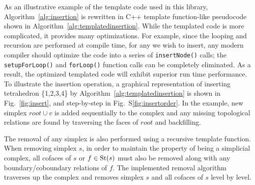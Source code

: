 		\par As an illustrative example of the template code used in this library, Algorithm~\ref{alg:insertion} is rewritten in C++ template function-like pseudocode shown in Algorithm~\ref{alg:templatedinsertion}. While the templated code is more complicated, it provides many optimizations. For example, since the looping and recursion are performed at compile time, for any  we wish to insert, any modern compiler should optimize the code into a series of \verb|insertNode()| calls; the \verb|setupForLoop()| and \verb|forLoop()| function calls can be completely eliminated. As a result, the optimized templated code will exhibit superior run time performance. To illustrate the insertion operation, a graphical representation of inserting tetrahedron \{1,2,3,4\} by Algorithm~\ref{alg:templatedinsertion} is shown in Fig.~\ref{fig:insert}, and step-by-step in Fig.~S\ref{fig:insertorder}. In the example, new simplex $root\cup v$ is added sequentially to the complex and any missing topological relations are found by traversing the faces of $root$ and backfilling.

		\par The removal of any simplex is also performed using a recursive template function.
		When removing simplex $s$, in order to maintain the property of being a simplicial complex, all cofaces of $s$ or $f \in \operatorname{St}(s)$ must also be removed along with any boundary/coboundary relations of $f$.
		The implemented removal algorithm traverses up the complex and removes simplex $s$ and all cofaces of $s$ level by level.

